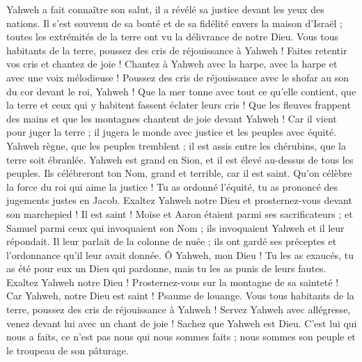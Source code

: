 \begin{multicols}{2}
Yahweh a fait connaître son salut, il a révélé sa justice devant les yeux des nations.
Il s'est souvenu de sa bonté et de sa fidélité envers la maison d’Israël ; toutes les extrémités de la terre ont vu la délivrance de notre Dieu.
Vous tous habitants de la terre, poussez des cris de réjouissance à Yahweh ! Faites retentir vos cris et chantez de joie !
Chantez à Yahweh avec la harpe, avec la harpe et avec une voix mélodieuse !
Poussez des cris de réjouissance avec le shofar au son du cor devant le roi, Yahweh !
Que la mer tonne avec tout ce qu'elle contient, que la terre et ceux qui y habitent fassent éclater leurs cris !
Que les fleuves frappent des mains et que les montagnes chantent de joie
devant Yahweh ! Car il vient pour juger la terre ; il jugera le monde avec justice et les peuples avec équité.
\VerseOne{}Yahweh règne, que les peuples tremblent ; il est assis entre les chérubins, que la terre soit ébranlée.
Yahweh est grand en Sion, et il est élevé au-dessus de tous les peuples.
Ils célébreront ton Nom, grand et terrible, car il est saint.
Qu’on célèbre la force du roi qui aime la justice ! Tu as ordonné l'équité, tu as prononcé des jugements justes en Jacob.
Exaltez Yahweh notre Dieu et prosternez-vous devant son marchepied ! Il est saint !
Moïse et Aaron étaient parmi ses sacrificateurs ; et Samuel parmi ceux qui invoquaient son Nom ; ils invoquaient Yahweh et il leur répondait.
Il leur parlait de la colonne de nuée ; ils ont gardé ses préceptes et l'ordonnance qu'il leur avait donnée.
Ô Yahweh, mon Dieu ! Tu les as exaucés, tu as été pour eux un Dieu qui pardonne, mais tu les as punis de leurs fautes.
Exaltez Yahweh notre Dieu ! Prosternez-vous sur la montagne de sa sainteté ! Car Yahweh, notre Dieu est saint !
\VerseOne{}Psaume de louange. Vous tous habitants de la terre, poussez des cris de réjouissance à Yahweh !
Servez Yahweh avec allégresse, venez devant lui avec un chant de joie !
Sachez que Yahweh est Dieu. C'est lui qui nous a faits, ce n'est pas nous qui nous sommes faits ; nous sommes son peuple et le troupeau de son pâturage.

\end{multicols}
